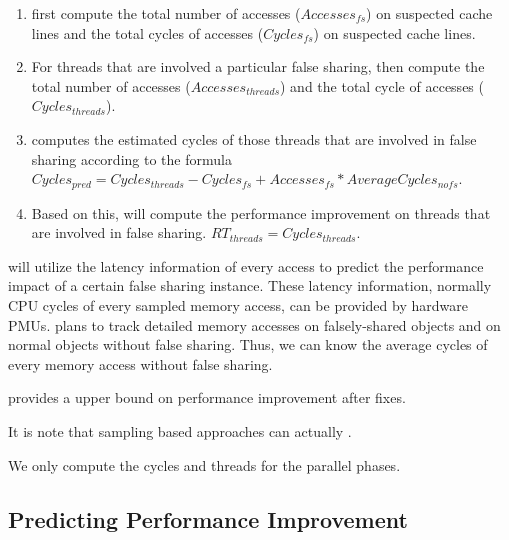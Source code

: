 \begin{enumerate}
\item \cheetah{} first compute the total number of accesses ($Accesses_{fs}$) on suspected cache lines and the total cycles of accesses ($Cycles_{fs}$) on suspected cache lines.

\item For threads that are involved a particular false sharing, \cheetah{} then compute the total number of accesses ($Accesses_{threads}$) and the total cycle of accesses ($Cycles_{threads}$). 

\item \Cheetah{} computes the estimated cycles of those threads that are involved in false sharing according to the formula $Cycles_{pred} = Cycles_{threads} - Cycles_{fs} + Accesses_{fs} * AverageCycles_{nofs}$. 

\item  Based on this, \cheetah{} will compute the performance improvement on threads that are involved in false sharing.
$RT_{threads} = Cycles_{threads}  $. 

\end{enumerate}



\cheetah{} will utilize the latency information of every access to predict the performance impact of a certain false sharing instance. These latency information, normally CPU cycles of every sampled memory access, can be provided by hardware PMUs. \Cheetah{} plans to track detailed memory accesses on falsely-shared objects and on normal objects without false sharing. Thus, we can know the average cycles of every memory access without false sharing. 

\cheetah{} provides a upper bound on performance improvement after fixes. 

It is note that sampling based approaches can actually 
.

We only compute the cycles and threads for the parallel phases. 

\subsection{Predicting Performance Improvement}




